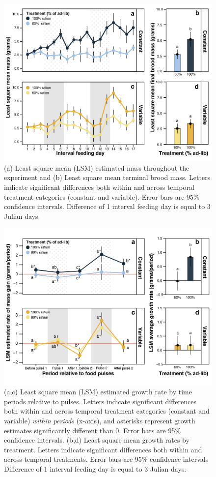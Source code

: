 \documentclass[11pt,]{article}
\begin{document}
\begin{figure}
\centering
\includegraphics{./fig2_mc_mass.png}
\caption{(a) Least square mean (LSM) estimated mass throughout the
experiment and (b) Least square mean terminal brood mass. Letters
indicate significant differences both within and across temporal
treatment categories (constant and variable). Error bars are 95\%
confidence intervals. Difference of 1 interval feeding day is equal to 3
Julian days.}
\end{figure}

\clearpage

\newpage

\begin{figure}
\centering
\includegraphics{./fig3_mc_growth.png}
\caption{(a,c) Least square mean (LSM) estimated growth rate by time
periods relative to pulses. Letters indicate significant differences
both within and across temporal treatment categories (constant and
variable) \emph{within periods} (x-axis), and asterisks represent growth
estimates significantly different than 0. Error bars are 95\% confidence
intervals. (b,d) Least square mean growth rates by treatment. Letters
indicate significant differences both within and across temporal
treatments. Error bars are 95\% confidence intervals Difference of 1
interval feeding day is equal to 3 Julian days.}
\end{figure}
\end{document}
